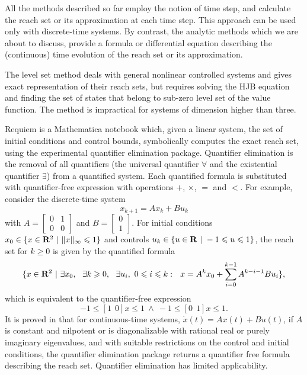 All the methods described so far employ the notion of time step,
and calculate the reach set or its approximation at each time step.
This approach can be used only with discrete-time systems.
By contrast, the analytic methods which we are about to discuss,
provide a formula or differential equation describing the (continuous)
time evolution of the reach set or its approximation.

The level set method \cite{MITCHELL_TOMLIN_LEVEL_SET_METHODS_FOR_COMPUTATION_IN_HYBRID_SYSTEMS,LEVEL_SET_TOOLBOX_HOMEPAGE} deals with general
nonlinear controlled systems and gives exact representation of
their reach sets, but requires solving the HJB equation and finding
the set of states that belong to sub-zero level set of the value function.
The method \cite{LEVEL_SET_TOOLBOX_HOMEPAGE} is impractical for systems of dimension higher
than three.

Requiem \cite{REQUIEM_HOMEPAGE} is a Mathematica notebook which, given a linear system,
the set of initial conditions and control bounds, symbolically computes
the exact reach set, using the experimental quantifier elimination package.
Quantifier elimination is the removal of all quantifiers (the universal
quantifier $\forall$ and the existential quantifier $\exists$) from a quantified
system. Each quantified formula is substituted with quantifier-free expression
with operations $+$, $\times$, $=$ and $<$. For example, consider the
discrete-time system
\[ x_{k+1} = Ax_k + Bu_k \]
with $A=\left[\begin{array}{cc}
0 & 1\\
0 & 0\end{array}\right]$ and $B=\left[\begin{array}{c}
0\\
1\end{array}\right]$.  For initial conditions
$x_0\in\{x\in {\bf R}^2 ~|~ \|x\|_{\infty} \leq 1\}$ and controls
$u_k\in\{u\in {\bf R} ~|~ -1\leq u\leq1\}$, the reach set for  $k\geq0$
is given by the quantified formula
\[\{ x\in{\bf R}^2 ~|~ \exists x_0, ~~ \exists k\geq 0, ~~
\exists u_i, ~ 0\leq i\leq k: ~~
x = A^kx_0+\sum_{i=0}^{k-1}A^{k-i-1}Bu_i \}, \]
which is equivalent to the quantifier-free expression
\[ -1\leq[1 ~~ 0]x\leq1 ~ \wedge ~ -1\leq[0 ~~ 1]x\leq1. \]
It is proved in \cite{LAFFERRIERE_PAPPAS_YOVINE_SYMBOLIC_REACHABILITY_COMPUTATION} that for continuous-time systems,
$\dot{x}(t) = Ax(t) + Bu(t)$, if $A$ is constant and nilpotent or
is diagonalizable with rational real or purely imaginary eigenvalues,
and with suitable restrictions on the control and initial conditions,
the quantifier elimination package returns a quantifier free formula
describing the reach set. Quantifier elimination has limited applicability.

